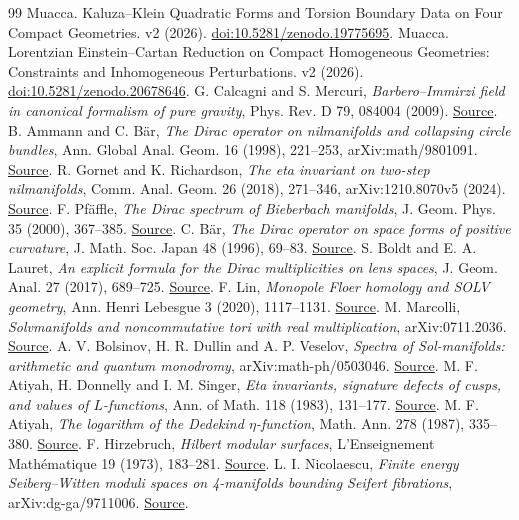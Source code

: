 \begin{thebibliography}{99}
 Muacca. Kaluza--Klein Quadratic Forms and Torsion Boundary Data on Four Compact Geometries. v2 (2026). \href{https://doi.org/10.5281/zenodo.19775695}{doi:10.5281/zenodo.19775695}.
 Muacca. Lorentzian Einstein--Cartan Reduction on Compact Homogeneous Geometries: Constraints and Inhomogeneous Perturbations. v2 (2026). \href{https://doi.org/10.5281/zenodo.20678646}{doi:10.5281/zenodo.20678646}.
 G. Calcagni and S. Mercuri, \emph{Barbero--Immirzi field in canonical formalism of pure gravity}, Phys. Rev. D 79, 084004 (2009). \href{https://arxiv.org/abs/0902.0957}{Source}.
 B. Ammann and C. B\"ar, \emph{The Dirac operator on nilmanifolds and collapsing circle bundles}, Ann. Global Anal. Geom. 16 (1998), 221--253, arXiv:math/9801091. \href{https://arxiv.org/abs/math/9801091}{Source}.
 R. Gornet and K. Richardson, \emph{The eta invariant on two-step nilmanifolds}, Comm. Anal. Geom. 26 (2018), 271--346, arXiv:1210.8070v5 (2024). \href{https://arxiv.org/abs/1210.8070v5}{Source}.
 F. Pf\"affle, \emph{The Dirac spectrum of Bieberbach manifolds}, J. Geom. Phys. 35 (2000), 367--385. \href{https://www.sciencedirect.com/science/article/pii/S039304400000005X}{Source}.
 C. B\"ar, \emph{The Dirac operator on space forms of positive curvature}, J. Math. Soc. Japan 48 (1996), 69--83. \href{https://www.jstage.jst.go.jp/article/jmath1948/48/1/48_1_69/_article/-char/en}{Source}.
 S. Boldt and E. A. Lauret, \emph{An explicit formula for the Dirac multiplicities on lens spaces}, J. Geom. Anal. 27 (2017), 689--725. \href{https://arxiv.org/abs/1412.2599}{Source}.
 F. Lin, \emph{Monopole Floer homology and SOLV geometry}, Ann. Henri Lebesgue 3 (2020), 1117--1131. \href{https://doi.org/10.5802/ahl.56}{Source}.
 M. Marcolli, \emph{Solvmanifolds and noncommutative tori with real multiplication}, arXiv:0711.2036. \href{https://arxiv.org/abs/0711.2036}{Source}.
 A. V. Bolsinov, H. R. Dullin and A. P. Veselov, \emph{Spectra of Sol-manifolds: arithmetic and quantum monodromy}, arXiv:math-ph/0503046. \href{https://arxiv.org/abs/math-ph/0503046}{Source}.
 M. F. Atiyah, H. Donnelly and I. M. Singer, \emph{Eta invariants, signature defects of cusps, and values of \(L\)-functions}, Ann. of Math. 118 (1983), 131--177. \href{https://annals.math.princeton.edu/1983/118-1/p08}{Source}.
 M. F. Atiyah, \emph{The logarithm of the Dedekind \(\eta\)-function}, Math. Ann. 278 (1987), 335--380. \href{https://webhomes.maths.ed.ac.uk/~v1ranick/papers/atiyahlg.pdf}{Source}.
 F. Hirzebruch, \emph{Hilbert modular surfaces}, L'Enseignement Math\'ematique 19 (1973), 183--281. \href{https://webhomes.maths.ed.ac.uk/~v1ranick/papers/hirzhilb.pdf}{Source}.
 L. I. Nicolaescu, \emph{Finite energy Seiberg--Witten moduli spaces on 4-manifolds bounding Seifert fibrations}, arXiv:dg-ga/9711006. \href{https://arxiv.org/abs/dg-ga/9711006}{Source}.
\end{thebibliography}
